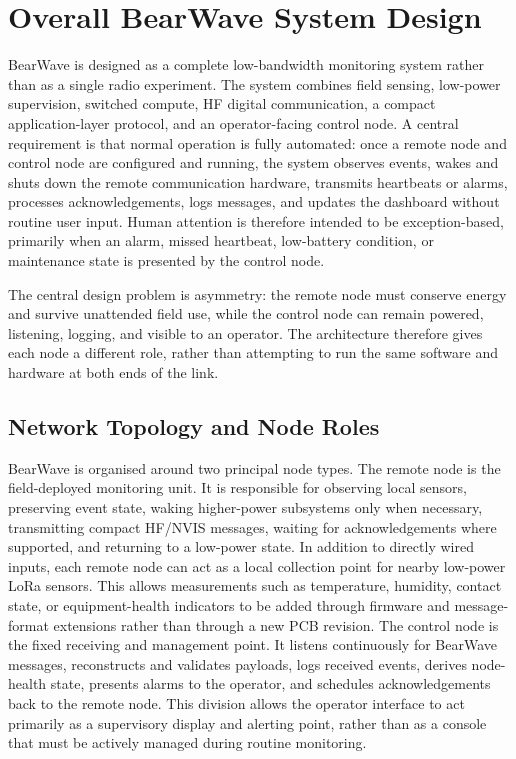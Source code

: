 \documentclass[acmsmall,screen]{acmart}
\begin{document}
\section{Overall BearWave System Design}
BearWave is designed as a complete low-bandwidth monitoring system rather than as a single radio experiment. The system combines field sensing, low-power supervision, switched compute, HF digital communication, a compact application-layer protocol, and an operator-facing control node. A central requirement is that normal operation is fully automated: once a remote node and control node are configured and running, the system observes events, wakes and shuts down the remote communication hardware, transmits heartbeats or alarms, processes acknowledgements, logs messages, and updates the dashboard without routine user input. Human attention is therefore intended to be exception-based, primarily when an alarm, missed heartbeat, low-battery condition, or maintenance state is presented by the control node.

The central design problem is asymmetry: the remote node must conserve energy and survive unattended field use, while the control node can remain powered, listening, logging, and visible to an operator. The architecture therefore gives each node a different role, rather than attempting to run the same software and hardware at both ends of the link.

\subsection{Network Topology and Node Roles}
BearWave is organised around two principal node types. The remote node is the field-deployed monitoring unit. It is responsible for observing local sensors, preserving event state, waking higher-power subsystems only when necessary, transmitting compact HF/NVIS messages, waiting for acknowledgements where supported, and returning to a low-power state. In addition to directly wired inputs, each remote node can act as a local collection point for nearby low-power LoRa sensors. This allows measurements such as temperature, humidity, contact state, or equipment-health indicators to be added through firmware and message-format extensions rather than through a new PCB revision. The control node is the fixed receiving and management point. It listens continuously for BearWave messages, reconstructs and validates payloads, logs received events, derives node-health state, presents alarms to the operator, and schedules acknowledgements back to the remote node. This division allows the operator interface to act primarily as a supervisory display and alerting point, rather than as a console that must be actively managed during routine monitoring.
\end{document}
